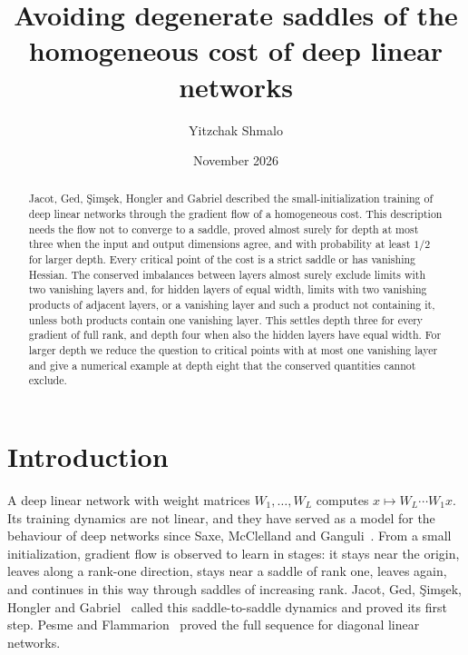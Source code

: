 \documentclass[11pt]{amsart}
\title[Degenerate saddles of the homogeneous cost]{Avoiding degenerate saddles of the homogeneous cost of deep linear networks}
\author{Yitzchak Shmalo}
\date{November 2026}
\theoremstyle{definition}
\theoremstyle{remark}
\numberwithin{equation}{section}
\begin{document}
\begin{abstract}
Jacot, Ged, \c{S}im\c{s}ek, Hongler and Gabriel described the small-initialization training of deep linear networks through the gradient flow of a homogeneous cost. This description needs the flow not to converge to a saddle, proved almost surely for depth at most three when the input and output dimensions agree, and with probability at least $1/2$ for larger depth. Every critical point of the cost is a strict saddle or has vanishing Hessian. The conserved imbalances between layers almost surely exclude limits with two vanishing layers and, for hidden layers of equal width, limits with two vanishing products of adjacent layers, or a vanishing layer and such a product not containing it, unless both products contain one vanishing layer. This settles depth three for every gradient of full rank, and depth four when also the hidden layers have equal width. For larger depth we reduce the question to critical points with at most one vanishing layer and give a numerical example at depth eight that the conserved quantities cannot exclude.
\end{abstract}
\maketitle

\section{Introduction}\label{sec:intro}
\enlargethispage{2pt}
A deep linear network with weight matrices $W_1,\dots,W_L$ computes $x\mapsto W_L\cdots W_1x$. Its training dynamics are not linear, and they have served as a model for the behaviour of deep networks since Saxe, McClelland and Ganguli~\cite{SMG}. From a small initialization, gradient flow is observed to learn in stages: it stays near the origin, leaves along a rank-one direction, stays near a saddle of rank one, leaves again, and continues in this way through saddles of increasing rank. Jacot, Ged, \c{S}im\c{s}ek, Hongler and Gabriel~\cite{JGSHG} called this saddle-to-saddle dynamics and proved its first step. Pesme and Flammarion~\cite{PF} proved the full sequence for diagonal linear networks.
\end{document}
